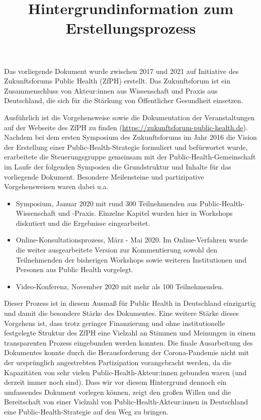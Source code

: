 \documentclass{article}
\begin{document}
\title{Hintergrundinformation zum Erstellungsprozess}

\maketitle


 Das vorliegende Dokument wurde zwischen 2017 und 2021 auf Initiative des Zukunftsforums Public Health (ZfPH) erstellt. Das Zukunftsforum ist ein Zusammenschluss von Akteur:innen aus Wissenschaft und Praxis aus Deutschland, die sich für die Stärkung von Öffentlicher Gesundheit einsetzen.


Ausführlich ist die Vorgehensweise sowie die Dokumentation der Veranstaltungen auf der Webseite des ZfPH zu finden (\href{https://zukunftsforum-public-health.de}{https://zukunftsforum-public-health.de}). Nachdem bei dem ersten Symposium des Zukunftsforums im Jahr 2016 die Vision der Erstellung einer Public-Health-Strategie formuliert und befürwortet wurde, erarbeitete die Steuerungsgruppe gemeinsam mit der Public-Health-Gemeinschaft im Laufe der folgenden Symposien die Grundstruktur und Inhalte für das vorliegende Dokument. Besondere Meilensteine und partizipative Vorgehensweisen waren dabei u.a.

\begin{itemize}
\item Symposium, Januar 2020 mit rund 300 Teilnehmenden aus Public-Health-Wissenschaft und -Praxis. Einzelne Kapitel wurden hier in Workshops diskutiert und die Ergebnisse eingearbeitet.


\item Online-Konsultationsprozess, März - Mai 2020. Im Online-Verfahren wurde die weiter ausgearbeitete Version zur Kommentierung sowohl den Teilnehmenden der bisherigen Workshops sowie weiteren Institutionen und Personen aus Public Health vorgelegt.


\item Video-Konferenz, November 2020 mit mehr als 100 Teilnehmenden.


\end{itemize}

Dieser Prozess ist in diesem Ausmaß für Public Health in Deutschland einzigartig und damit die besondere Stärke des Dokumentes. Eine weitere Stärke dieses Vorgehens ist, dass trotz geringer Finanzierung und ohne institutionelle festgelegte Struktur des ZfPH eine Vielzahl an Stimmen und Meinungen in einem transparenten Prozess eingebunden werden konnten. Die finale Ausarbeitung des Dokumentes konnte durch die Herausforderung der Corona-Pandemie nicht mit der ursprünglich angestrebten Partizipation vorangebracht werden, da die Kapazitäten von sehr vielen Public-Health-Akteur:innen gebunden waren (und derzeit immer noch sind). Dass wir vor diesem Hintergrund dennoch ein umfassendes Dokument vorlegen können, zeigt den großen Willen und die Bereitschaft von einer Vielzahl von Public-Health-Akteur:innen in Deutschland eine Public-Health-Strategie auf den Weg zu bringen.
\end{document}
